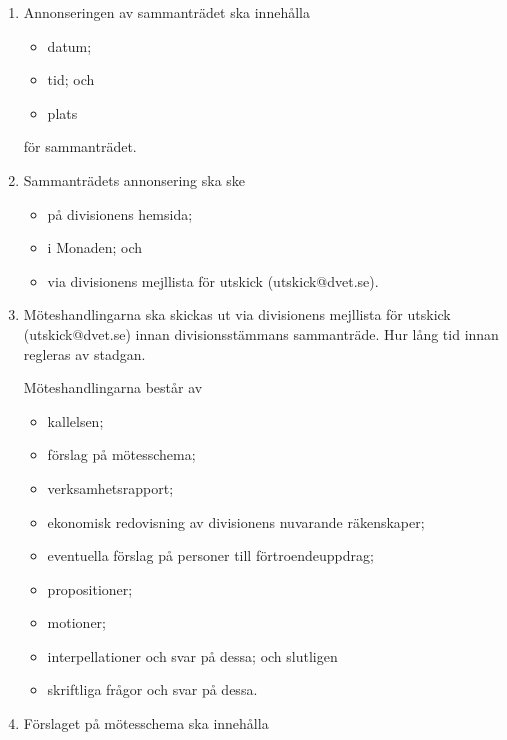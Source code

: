 \documentclass{dvd}
\begin{document}
\begin{enumerate}[label=\arabic* §, ref=\arabic*]
	\item Annonseringen av sammanträdet ska innehålla

	      \begin{itemize}
		      \item datum;
		      \item tid; och
		      \item plats
	      \end{itemize}

	      för sammanträdet.

	\item Sammanträdets annonsering ska ske

	      \begin{itemize}
		      \item på divisionens hemsida;
		      \item i Monaden; och
		      \item via divisionens mejllista för utskick (utskick@dvet.se).
	      \end{itemize}

	\item Möteshandlingarna ska skickas ut via divisionens mejllista för utskick (utskick@dvet.se) innan divisionsstämmans sammanträde.
	      Hur lång tid innan regleras av stadgan.

	      Möteshandlingarna består av

	      \begin{itemize}
		      \item kallelsen;
		      \item förslag på mötesschema;
		      \item verksamhetsrapport;
		      \item ekonomisk redovisning av divisionens nuvarande räkenskaper;
		      \item eventuella förslag på personer till förtroendeuppdrag;
		      \item propositioner;
		      \item motioner;
		      \item interpellationer och svar på dessa; och slutligen
		      \item skriftliga frågor och svar på dessa.
	      \end{itemize}

	\item Förslaget på mötesschema ska innehålla


\end{enumerate}
\end{document}
